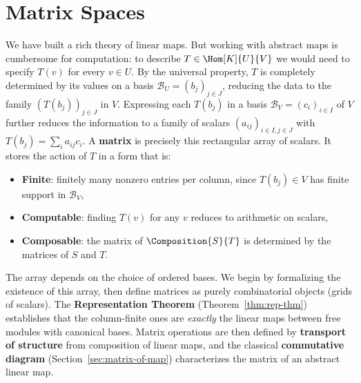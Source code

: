 
\section{Matrix Spaces}
\label{sec:mat-spaces}


\begin{remark}
    We have built a rich theory of linear maps. But working with abstract maps is cumbersome
    for computation: to describe $T \in \Hom[K]{U}{V}$ we would need to specify $T(v)$ for
    every $v \in U$. By the universal property, $T$ is completely determined by its values
    on a basis $\mathcal{B}_U = (b_j)_{j \in J}$, reducing the data to the family
    $(T(b_j))_{j \in J}$ in $V$. Expressing each $T(b_j)$ in a basis
    $\mathcal{B}_V = (c_i)_{i \in I}$ of $V$ further reduces the information to a family
    of scalars $(a_{ij})_{i \in I, j \in J}$ with $T(b_j) = \sum_i a_{ij} c_i$.
    A \textbf{matrix} is precisely this rectangular array of scalars. It stores the action
    of $T$ in a form that is:
    \begin{itemize}
        \item \textbf{Finite}: finitely many nonzero entries per column, since $T(b_j) \in V$
              has finite support in $\mathcal{B}_V$,
        \item \textbf{Computable}: finding $T(v)$ for any $v$ reduces to arithmetic on scalars,
        \item \textbf{Composable}: the matrix of $\Composition{S}{T}$ is determined by the
              matrices of $S$ and $T$.
    \end{itemize}
    The array depends on the choice of ordered bases. We begin by formalizing the existence of
    this array, then define matrices as purely combinatorial objects (grids of scalars). The
    \textbf{Representation Theorem} (Theorem~\ref{thm:rep-thm}) establishes that the
    column-finite ones are \emph{exactly} the linear maps between free modules with canonical
    bases. Matrix operations are then defined by \textbf{transport of structure} from
    composition of linear maps, and the classical \textbf{commutative diagram}
    (Section~\ref{sec:matrix-of-map}) characterizes the matrix of an abstract linear map.
\end{remark}

